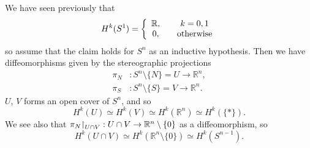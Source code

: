 \begin{xmpl}[Cohomology of $S^n$]
We have seen previously that
$$
  H^k(S^1)
= \left\{
    \begin{array}{c c}
      \mathbb{R}, & \quad k = 0, 1 \\
      0,          & \quad \text{otherwise}
    \end{array}
  \right.
$$
so assume that the claim holds for $S^n$ as an inductive
hypothesis. Then we have diffeomorphisms given by the
stereographic projections
\begin{align*}
   \pi_N
&: S^n \setminus \{ N \} = U \to \mathbb{R}^n, \\
   \pi_S
&: S^n \setminus \{ S \} = V \to \mathbb{R}^n.
\end{align*}
$U$, $V$ forms an open cover of $S^n$, and so
$$
       H^k(U)
\simeq H^k(V)
\simeq H^k(\mathbb{R}^n)
\simeq H^k(\{ \ast \}).
$$
We see also that
$
  \pi_N \mathord{\upharpoonright}_{U \cap V}
: U \cap V \to \mathbb{R}^n \setminus \{ 0 \}
$
as a diffeomorphism, so
$$
       H^k(U \cap V)
\simeq H^k(\mathbb{R}^n \setminus \{ 0 \})
\simeq H^k(S^{n - 1}).
$$

\end{xmpl}
